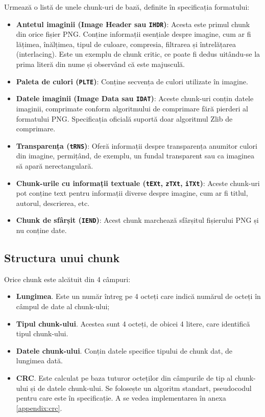 \documentclass[a4paper,12pt]{report}
\begin{document}
Urmează o listă de unele chunk-uri de bază, definite în specificația formatului:
\begin{itemize}
  \item
      \textbf{Antetul imaginii (Image Header sau \texttt{IHDR})}:
      Acesta este primul chunk din orice fișier \ac{PNG}.
      Conține informații esențiale despre imagine, cum ar fi lățimea,
      înălțimea, tipul de culoare, compresia, filtrarea și întrelățarea (interlacing).
      Este un exemplu de chunk critic, ce poate fi dedus uitându-se
      la prima literă din nume și observând că este majusculă.

  \item
      \textbf{Paleta de culori (\texttt{PLTE})}:
      Conține secvența de culori utilizate în imagine.

  \item
      \textbf{Datele imaginii (Image Data sau \texttt{IDAT})}:
      Aceste chunk-uri conțin datele imaginii,
      comprimate conform algoritmului de comprimare fără pierderi al formatului \ac{PNG}.
      Specificația oficială suportă doar algoritmul Zlib de comprimare.

  \item
      \textbf{Transparența (\texttt{tRNS})}:
      Oferă informații despre transparența anumitor culori din imagine,
      permițând, de exemplu, un fundal transparent sau ca imaginea să apară nerectangulară.

  \item
      \textbf{Chunk-urile cu informații textuale (\texttt{tEXt}, \texttt{zTXt}, \texttt{iTXt})}:
      Aceste chunk-uri pot conține text pentru informații diverse despre imagine,
        cum ar fi titlul, autorul, descrierea, etc.

  \item
      \textbf{Chunk de sfârșit (\texttt{IEND})}:
      Acest chunk marchează sfârșitul fișierului \ac{PNG} și nu conține date.
\end{itemize}

\subsection{Structura unui chunk}

Orice chunk este alcătuit din 4 câmpuri:
\begin{itemize}
    \item \textbf{Lungimea}. Este un număr întreg pe 4 octeți care indică numărul de octeți în câmpul de date al chunk-ului;
    \item \textbf{Tipul chunk-ului}. Acestea sunt 4 octeți, de obicei 4 litere, care identifică tipul chunk-ului.
    \item \textbf{Datele chunk-ului}. Conțin datele specifice tipului de chunk dat, de lungimea dată.
    \item \textbf{\ac{CRC}}.
        Este calculat pe baza tuturor octeților din câmpurile de tip al chunk-ului și de datele chunk-ului. 
        Se folosește un algoritm standart, pseudocodul pentru care este în specificație.
        A se vedea implementarea în anexa \ref{appendix:crc}.
\end{itemize}
\end{document}
